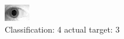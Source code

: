 \begin{figure}[h!]
\begin{center}
\includegraphics[width=0.60\columnwidth]{figures/ID1940_class_4_target_3.png}
\end{center}
\caption{ Classification: 4 actual target: 3}
\label{fig:ID1940_class_4_target_3}
\end{figure}

